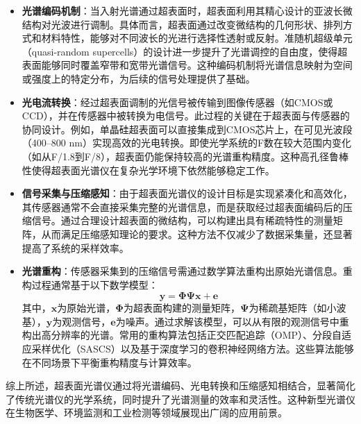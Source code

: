 \documentclass[12pt,hyperref,a4paper,UTF8]{ctexart}
\begin{document}
\begin{itemize}
    \item \textbf{光谱编码机制}：当入射光谱通过超表面时，超表面利用其精心设计的亚波长微结构对光波进行调制。具体而言，超表面通过改变微结构的几何形状、排列方式和材料特性，能够对不同波长的光进行选择性透射或反射。准随机超级单元（quasi-random supercells）的设计进一步提升了光谱调控的自由度，使得超表面能够同时覆盖窄带和宽带光谱信号。这种编码机制将光谱信息映射为空间或强度上的特定分布，为后续的信号处理提供了基础。

    \item \textbf{光电流转换}：经过超表面调制的光信号被传输到图像传感器（如CMOS或CCD），并在传感器中被转换为电信号。此过程的关键在于超表面与传感器的协同设计。例如，单晶硅超表面可以直接集成到CMOS芯片上，在可见光波段（400--800 nm）实现高效的光电转换。即使光学系统的F数在较大范围内变化（如从F/1.8到F/8），超表面仍能保持较高的光谱重构精度。这种高孔径鲁棒性使得超表面光谱仪在复杂光学环境下依然能够稳定工作。

    \item \textbf{信号采集与压缩感知}：由于超表面光谱仪的设计目标是实现紧凑化和高效化，其传感器通常不会直接采集完整的光谱信息，而是获取经过超表面编码后的压缩信号。通过合理设计超表面的微结构，可以构建出具有稀疏特性的测量矩阵，从而满足压缩感知理论的要求。这种方法不仅减少了数据采集量，还显著提高了系统的采样效率。

    \item \textbf{光谱重构}：传感器采集到的压缩信号需通过数学算法重构出原始光谱信息。重构过程通常基于以下数学模型：
    \[
    \mathbf{y} = \mathbf{\Phi} \mathbf{\Psi} \mathbf{x} + \mathbf{e}
    \]
    其中，\(\mathbf{x}\)为原始光谱，\(\mathbf{\Phi}\)为超表面构建的测量矩阵，\(\mathbf{\Psi}\)为稀疏基矩阵（如小波基），\(\mathbf{y}\)为观测信号，\(\mathbf{e}\)为噪声。通过求解该模型，可以从有限的观测信号中重构出高分辨率的光谱。常用的重构算法包括正交匹配追踪（OMP）、分段自适应采样优化（SASCS）以及基于深度学习的卷积神经网络方法。这些算法能够在不同场景下平衡重构精度与计算效率。

\end{itemize}

综上所述，超表面光谱仪通过将光谱编码、光电转换和压缩感知相结合，显著简化了传统光谱仪的光学系统，同时提升了光谱测量的效率和灵活性。这种新型光谱仪在生物医学、环境监测和工业检测等领域展现出广阔的应用前景。
\end{document}
